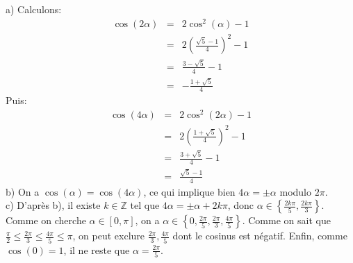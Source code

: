 a) Calculons:
\begin{eqnarray*}
  \cos(2\alpha) &=& 2\cos^2(\alpha)-1 \\
  &=& 2\left( \frac{\sqrt{5}-1}{4} \right)^2 -1 \\
  &=& \frac{3-\sqrt{5}}{4} -1 \\
  &=& -\frac{1+\sqrt{5}}{4} 
\end{eqnarray*}
Puis:
\begin{eqnarray*}
  \cos(4\alpha) &=& 2\cos^2(2\alpha)-1 \\
  &=& 2\left( \frac{1+\sqrt{5}}{4} \right)^2 -1 \\
  &=& \frac{3+\sqrt{5}}{4} -1 \\
  &=& \frac{\sqrt{5}-1}{4} 
\end{eqnarray*}
b) On a $\cos(\alpha)=\cos(4\alpha)$, ce qui implique bien $4\alpha = \pm \alpha$ modulo $2\pi$. \\
c) D’après b), il existe $k\in \mathbb{Z}$ tel que $4\alpha = \pm \alpha + 2k\pi$, donc $\alpha \in \left\lbrace \frac{2k\pi}{5}, \frac{2k\pi}{3} \right\rbrace$.  Comme on cherche $\alpha \in [0,\pi]$, on a $\alpha \in \left\lbrace 0, \frac{2\pi}{5}, \frac{2\pi}{3}, \frac{4\pi}{5} \right\rbrace$. Comme on sait que $\frac{\pi}{2} \leq  \frac{2\pi}{3} \leq \frac{4\pi}{5} \leq \pi $, on peut exclure $ \frac{2\pi}{3}, \frac{4\pi}{5} $ dont le cosinus est négatif. Enfin, comme $\cos(0)=1$, il ne reste que $\alpha = \frac{2\pi}{5}$.
